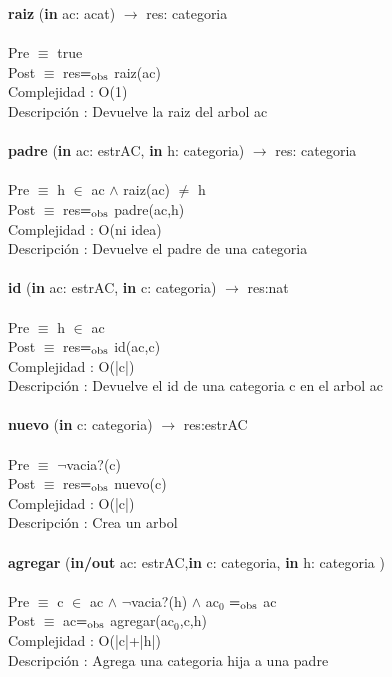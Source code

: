 \documentclass[10pt, a4paper]{article}
\begin{document}
	\textbf{raiz} (\textbf{in} ac: acat) $\longrightarrow$ res: categoria\\\\
	Pre $\equiv$ {true}\\
	Post $\equiv$ {res$=_{\mathrm{obs}}$ raiz(ac)}\\
	Complejidad : O(1)\\
	Descripci\'{o}n : Devuelve la raiz del arbol ac\\\\
	
	\textbf{padre} (\textbf{in} ac: estrAC, \textbf{in} h: categoria) $\longrightarrow$ res: categoria\\\\
	Pre $\equiv$ {h $\in$ ac $\wedge$ raiz(ac) $\neq$ h}\\
	Post $\equiv$ {res$=_{\mathrm{obs}}$ padre(ac,h)}\\
	Complejidad : O(ni idea)\\
	Descripci\'{o}n : Devuelve el padre de una categoria\\\\
		
	\textbf{id} (\textbf{in} ac: estrAC, \textbf{in} c: categoria) $\longrightarrow$ res:nat\\\\
	Pre $\equiv$ {h $\in$ ac}\\
	Post $\equiv$ {res$=_{\mathrm{obs}}$ id(ac,c)}\\
	Complejidad : O(|c|)\\
	Descripci\'{o}n : Devuelve el id de una categoria c en el arbol ac\\\\	
	
	\textbf{nuevo} (\textbf{in} c: categoria) $\longrightarrow$ res:estrAC\\\\
	Pre $\equiv$ {$¬$vacia?(c)}\\
	Post $\equiv$ {res$=_{\mathrm{obs}}$ nuevo(c)}\\
	Complejidad : O(|c|)\\
	Descripci\'{o}n : Crea un arbol\\\\	
	
	\textbf{agregar} (\textbf{in/out} ac: estrAC,\textbf{in} c: categoria, \textbf{in} h: categoria )\\\\
	Pre $\equiv$ {c $\in$ ac $\wedge$ $¬$vacia?(h) $\wedge$ ac${_0}$ $=_{\mathrm{obs}}$ ac}\\
	Post $\equiv$ {ac$=_{\mathrm{obs}}$ agregar(ac${_0}$,c,h)}\\
	Complejidad : O(|c|+|h|)\\
	Descripci\'{o}n : Agrega una categoria hija a una padre\\\\
	
\end{document}
